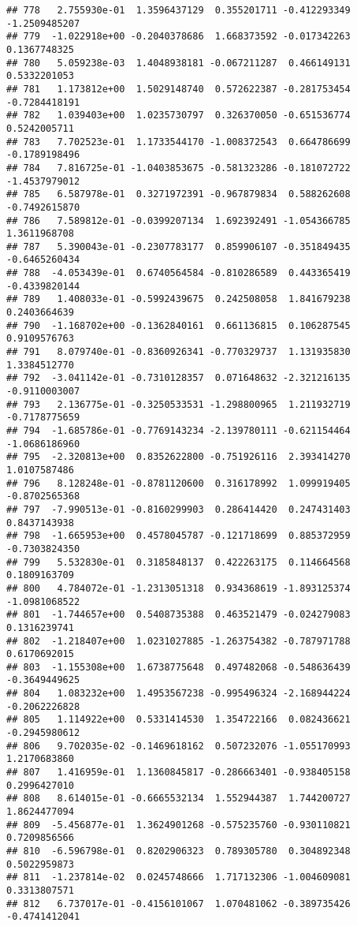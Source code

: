 \documentclass[
]{article}
\begin{document}
\begin{verbatim}
## 778   2.755930e-01  1.3596437129  0.355201711 -0.412293349 -1.2509485207
## 779  -1.022918e+00 -0.2040378686  1.668373592 -0.017342263  0.1367748325
## 780   5.059238e-03  1.4048938181 -0.067211287  0.466149131  0.5332201053
## 781   1.173812e+00  1.5029148740  0.572622387 -0.281753454 -0.7284418191
## 782   1.039403e+00  1.0235730797  0.326370050 -0.651536774  0.5242005711
## 783   7.702523e-01  1.1733544170 -1.008372543  0.664786699 -0.1789198496
## 784   7.816725e-01 -1.0403853675 -0.581323286 -0.181072722 -1.4537979012
## 785   6.587978e-01  0.3271972391 -0.967879834  0.588262608 -0.7492615870
## 786   7.589812e-01 -0.0399207134  1.692392491 -1.054366785  1.3611968708
## 787   5.390043e-01 -0.2307783177  0.859906107 -0.351849435 -0.6465260434
## 788  -4.053439e-01  0.6740564584 -0.810286589  0.443365419 -0.4339820144
## 789   1.408033e-01 -0.5992439675  0.242508058  1.841679238  0.2403664639
## 790  -1.168702e+00 -0.1362840161  0.661136815  0.106287545  0.9109576763
## 791   8.079740e-01 -0.8360926341 -0.770329737  1.131935830  1.3384512770
## 792  -3.041142e-01 -0.7310128357  0.071648632 -2.321216135 -0.9110003007
## 793   2.136775e-01 -0.3250533531 -1.298800965  1.211932719 -0.7178775659
## 794  -1.685786e-01 -0.7769143234 -2.139780111 -0.621154464 -1.0686186960
## 795  -2.320813e+00  0.8352622800 -0.751926116  2.393414270  1.0107587486
## 796   8.128248e-01 -0.8781120600  0.316178992  1.099919405 -0.8702565368
## 797  -7.990513e-01 -0.8160299903  0.286414420  0.247431403  0.8437143938
## 798  -1.665953e+00  0.4578045787 -0.121718699  0.885372959 -0.7303824350
## 799   5.532830e-01  0.3185848137  0.422263175  0.114664568  0.1809163709
## 800   4.784072e-01 -1.2313051318  0.934368619 -1.893125374 -1.0981068522
## 801  -1.744657e+00  0.5408735388  0.463521479 -0.024279083  0.1316239741
## 802  -1.218407e+00  1.0231027885 -1.263754382 -0.787971788  0.6170692015
## 803  -1.155308e+00  1.6738775648  0.497482068 -0.548636439 -0.3649449625
## 804   1.083232e+00  1.4953567238 -0.995496324 -2.168944224 -0.2062226828
## 805   1.114922e+00  0.5331414530  1.354722166  0.082436621 -0.2945980612
## 806   9.702035e-02 -0.1469618162  0.507232076 -1.055170993  1.2170683860
## 807   1.416959e-01  1.1360845817 -0.286663401 -0.938405158  0.2996427010
## 808   8.614015e-01 -0.6665532134  1.552944387  1.744200727  1.8624477094
## 809  -5.456877e-01  1.3624901268 -0.575235760 -0.930110821  0.7209856566
## 810  -6.596798e-01  0.8202906323  0.789305780  0.304892348  0.5022959873
## 811  -1.237814e-02  0.0245748666  1.717132306 -1.004609081  0.3313807571
## 812   6.737017e-01 -0.4156101067  1.070481062 -0.389735426 -0.4741412041

\end{verbatim}
\end{document}
